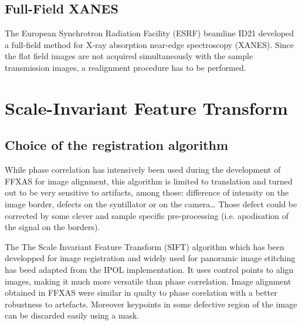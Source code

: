 \documentclass[preprint]{iucr}
\begin{document}
\subsection{Full-Field XANES}
The European Synchrotron Radiation Facility (ESRF) beamline ID21 developed a full-field method for X-ray absorption near-edge spectroscopy\cite{fullfield} (XANES). %
Since the flat field images are not acquired simultaneously with the sample transmission images, a realignment procedure has to be performed.

 


\section{Scale-Invariant Feature Transform}
\subsection{Choice of the registration algorithm}
While phase correlation has intensively been used during the development of
FFXAS for image alignment, this algorithm is limited to translation and turned
out to be very sensitive to artifacts, among those: difference of intensity on
the image border, defects on the syntillator or on the camera\ldots 
Those defect could be corrected by some clever and sample specific
pre-processing (i.e. apodisation of the signal on the borders).

The The Scale Invariant Feature Transform (SIFT) algorithm \cite{Lowe99,Lowe04} which has been developped
for image registration and widely used for panoramic image stitching has beed
adapted from the IPOL\cite{ASIFT} implementation. It uses control points to align images, making it much more versatile than phase correlation. Image alignment obtained in
FFXAS were similar in qualty to phase corelation with a better robustness to
artefacts. Moreover keypoints in some defective region of the image can be
discarded easily using a mask.
\end{document}
